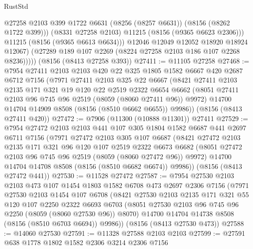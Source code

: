 \begin{lexlean}{RustStd}
\begin{coremodule}
                  @27258
                  @2103
                  @399
                  @1722
                  @6631
                  (@8256 (@8257 @6631))
                  (@8156 (@8262 @1722 @399)))
                (@8331 @27258 @2103)
                @11215
                (@8156 (@9365 @6623 @2306)))
              @11215
              (@8156 (@9365 @6613 @6634)))
            @12046
            @12049
            @12052
            @18920
            @18924
            @12067)
          (@27289 @189 @107 @2269 (@8224 @27258 @2103 @186 @107 @2268 @8236)))))
    (@8156 (@8413 @27258 @393))
@27411 := @11105 @27258
@27468 := @7954
    @27411
    @2103
    @2103
    @420
    @22
    @325
    @1805
    @1582
    @6667
    @420
    @2687
    @6712
    @7156
    (@7971
      @27411
      @2103
      @325
      @22
      @6667
      (@8421
        @27411
        @2103
        @2135
        @171
        @321
        @19
        @120
        @22
        @2519
        @2322
        @6654
        @6662
        (@8051 @27411 @2103 @96 @745 @96 @2519 (@8059 (@8060 @27411 @96)) @9972)
        @14700
        @14704
        @14909
        @8508
        (@8156 (@8510 @6662 @6655))
        @9986))
    (@8156 (@8413 @27411 @420))
@27472 := @7906 (@11300 (@10888 @11301)) @27411
@27529 := @7954
    @27472
    @2103
    @2103
    @441
    @107
    @305
    @1804
    @1582
    @6687
    @441
    @2697
    @6711
    @7156
    (@7971
      @27472
      @2103
      @305
      @107
      @6687
      (@8421
        @27472
        @2103
        @2135
        @171
        @321
        @96
        @120
        @107
        @2519
        @2322
        @6673
        @6682
        (@8051 @27472 @2103 @96 @745 @96 @2519 (@8059 (@8060 @27472 @96)) @9972)
        @14700
        @14704
        @14708
        @8508
        (@8156 (@8510 @6682 @6674))
        @9986))
    (@8156 (@8413 @27472 @441))
@27530 := @11528 @27472
@27587 := @7954
    @27530
    @2103
    @2103
    @473
    @107
    @1454
    @1803
    @1582
    @6708
    @473
    @2697
    @2306
    @7156
    (@7971
      @27530
      @2103
      @1454
      @107
      @6708
      (@8421
        @27530
        @2103
        @2135
        @171
        @321
        @55
        @120
        @107
        @2250
        @2322
        @6693
        @6703
        (@8051 @27530 @2103 @96 @745 @96 @2250 (@8059 (@8060 @27530 @96)) @8070)
        @14700
        @14704
        @14738
        @8508
        (@8156 (@8510 @6703 @6694))
        @9986))
    (@8156 (@8413 @27530 @473))
@27588 := @14060 @27530
@27591 := @11328 @27588 @2103 @2103
@27599 := @27591 @638 @1778 @1802 @1582 @2306 @3214 @2306 @7156

\end{coremodule}
\end{lexlean}
